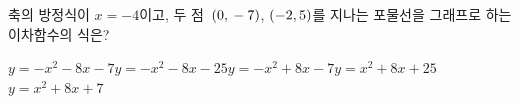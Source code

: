 축의 방정식이 $x=-4$이고, 두 점~$(0{,}\mkern3mu -7)$, $(-2{,}\mkern3mu 5)$를 지나는 포물선을 그래프로 하는 이차함수의 식은?
\begin{choicesii}{$y=-x^2-8x-7$}{$y=-x^2-8x-25$}{$y=-x^2+8x-7$}{$y=x^2+8x+25$}{$y=x^2+8x+7$}\end{choicesii}
